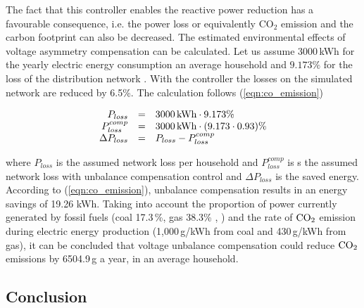             The fact that this controller enables the reactive power reduction has a favourable consequence, i.e. the power loss or equivalently CO$_2$ emission and the carbon footprint can also be decreased. The estimated environmental effects of voltage asymmetry compensation can be calculated. Let us assume 3000\,kWh for the yearly electric energy consumption an average household and $9.173\%$ for the loss of the distribution network \cite{MVM2013}. With the controller the losses on the simulated network are reduced by 6.5\%. The calculation follows (\ref{eqn:co_emission})

            \begin{equation}
                \label{eqn:co_emission}
                \begin{array}{rcl}
                 P_{loss}&=&3000\,\textnormal{kWh}\cdot9.173\%\\
                P^{comp}_{loss}&=&3000\,\textnormal{kWh}\cdot(9.173\cdot0.93)\%\\
                 \Delta P_{loss}&=&P_{loss}-P^{comp}_{loss}\\
                 \end{array}
                \end{equation}

            where $P_{loss}$ is the assumed network loss per household and $P^{comp}_{loss}$ is s the assumed network loss with unbalance compensation control and $\Delta P_{loss}$ is the saved energy. According to (\ref{eqn:co_emission}), unbalance compensation results in an energy savings of 19.26 kWh. Taking into account the proportion of power currently generated by fossil fuels (coal 17.3\,\%, gas 38.3\% \cite{MVM2013}, \cite{gorbe2012reduction}) and the rate of $\textnormal{CO}_2$ emission during electric energy production (1,000\,g/kWh from coal and 430\,g/kWh from gas), it can be concluded that voltage unbalance compensation could reduce $\textnormal{CO}_2$ emissions by 6504.9\,g a year, in an average household. %


\subsection{Conclusion}

